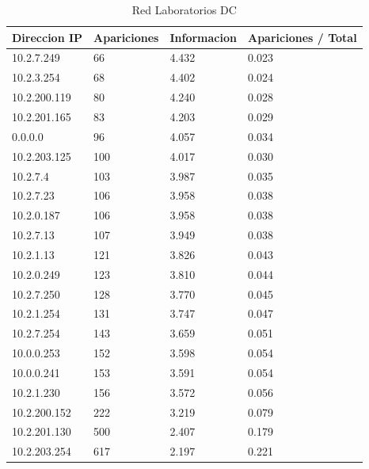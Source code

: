 \begin{table}[H]
\centering
\caption{Red Laboratorios DC}
\label{my-label}
\begin{tabular}{@{}llll@{}}
\toprule
Direccion IP & Apariciones & Informacion        & Apariciones / Total \\ \midrule
10.2.7.249   & 66          & 4.432   & 0.023               \\
10.2.3.254   & 68          & 4.402  & 0.024               \\
10.2.200.119 & 80          & 4.240  & 0.028               \\
10.2.201.165 & 83          & 4.203  & 0.029               \\
0.0.0.0      & 96          & 4.057  & 0.034               \\
10.2.203.125 & 100         & 4.017  & 0.030               \\
10.2.7.4     & 103         & 3.987  & 0.035               \\
10.2.7.23    & 106         & 3.958 & 0.038               \\
10.2.0.187   & 106         & 3.958 & 0.038               \\
10.2.7.13    & 107         & 3.949 & 0.038               \\
10.2.1.13    & 121         & 3.826  & 0.043               \\
10.2.0.249   & 123         & 3.810 & 0.044               \\
10.2.7.250   & 128         & 3.770 & 0.045               \\
10.2.1.254   & 131         & 3.747 & 0.047               \\
10.2.7.254   & 143         & 3.659 & 0.051               \\
10.0.0.253   & 152         & 3.598 & 0.054               \\
10.0.0.241   & 153         & 3.591  & 0.054               \\
10.2.1.230   & 156         & 3.572  & 0.056               \\
10.2.200.152 & 222         & 3.219 & 0.079               \\
10.2.201.130 & 500         & 2.407  & 0.179               \\
10.2.203.254 & 617         & 2.197 & 0.221               \\ \bottomrule
\end{tabular}
\end{table}


